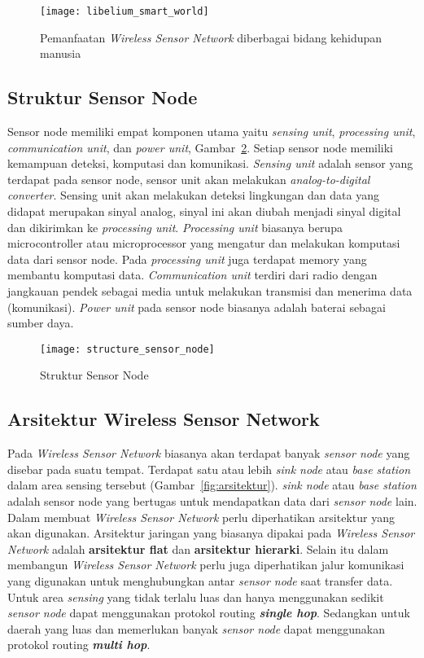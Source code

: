 \begin{figure} [H]
	\centering  
	\texttt{[image: libelium\_smart\_world]}  
	\caption[Pemanfaatan \textit{Wireless Sensor Network} diberbagai bidang kehidupan manusia]{Pemanfaatan \textit{Wireless Sensor Network} diberbagai bidang kehidupan manusia} 
	\label{fig:smartworld} 
\end{figure} 

\subsection{Struktur Sensor Node}
Sensor node memiliki empat komponen utama yaitu \textit{sensing unit}, \textit{processing unit}, \textit{communication unit}, dan \textit{power unit}, Gambar~\ref{fig:structure_sensor_node}. Setiap sensor node memiliki kemampuan deteksi, komputasi dan komunikasi. \textit{Sensing unit} adalah sensor yang terdapat pada sensor node, sensor unit akan melakukan \textit{analog-to-digital converter}. Sensing unit akan melakukan deteksi lingkungan dan data yang didapat merupakan sinyal analog, sinyal ini akan diubah menjadi sinyal digital dan dikirimkan ke \textit{processing unit}. \textit{Processing unit} biasanya berupa microcontroller atau microprocessor yang mengatur dan melakukan komputasi data dari sensor node. Pada \textit{processing unit} juga terdapat memory yang membantu komputasi data. \textit{Communication unit} terdiri dari radio dengan jangkauan pendek sebagai media untuk melakukan transmisi dan menerima data (komunikasi). \textit{Power unit} pada sensor node biasanya adalah baterai sebagai sumber daya. 

\begin{figure} [H]
	\centering  
	\texttt{[image: structure\_sensor\_node]}  
	\caption[Struktur Sensor Node]{Struktur Sensor Node} 
	\label{fig:structure_sensor_node} 
\end{figure} 

\subsection{Arsitektur Wireless Sensor Network}
Pada \textit{Wireless Sensor Network} biasanya akan terdapat banyak \textit{sensor node} yang disebar pada suatu tempat. Terdapat satu atau lebih \textit{sink node} atau \textit{base station} dalam area sensing tersebut (Gambar~\ref{fig:arsitektur}). \textit{sink node} atau \textit{base station} adalah sensor node yang bertugas untuk mendapatkan data dari \textit{sensor node} lain. Dalam membuat \textit{Wireless Sensor Network} perlu diperhatikan arsitektur yang akan digunakan. Arsitektur jaringan yang biasanya dipakai pada \textit{Wireless Sensor Network} adalah \textbf{arsitektur flat} dan \textbf{arsitektur hierarki}. Selain itu dalam membangun \textit{Wireless Sensor Network} perlu juga diperhatikan jalur komunikasi yang digunakan untuk menghubungkan antar \textit{sensor node} saat transfer data. Untuk area \textit{sensing} yang tidak terlalu luas dan hanya menggunakan sedikit \textit{sensor node} dapat menggunakan protokol routing \textbf{\textit{single hop}}. Sedangkan untuk daerah yang luas dan memerlukan banyak \textit{sensor node} dapat menggunakan protokol routing \textbf{\textit{multi hop}}. 

